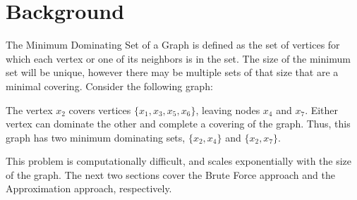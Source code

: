 \documentclass[paper.tex]{subfiles}
\begin{document}
\section{Background}

The Minimum Dominating Set of a Graph is defined as the set of vertices for which each vertex or one of its neighbors is in the set.
The size of the minimum set will be unique, however there may be multiple sets of that size that are a minimal covering.
Consider the following graph:

\vspace{5mm}
\begin{center}
\end{center}

The vertex $x_2$ covers vertices $\{x_1,x_3,x_5,x_6\}$, leaving nodes $x_4$ and $x_7$.
Either vertex can dominate the other and complete a covering of the graph.
Thus, this graph has two minimum dominating sets, $\{x_2,x_4\}$ and $\{x_2,x_7\}$.

This problem is computationally difficult, and scales exponentially with the size of the graph.
The next two sections cover the Brute Force approach and the Approximation approach, respectively.
\end{document}
